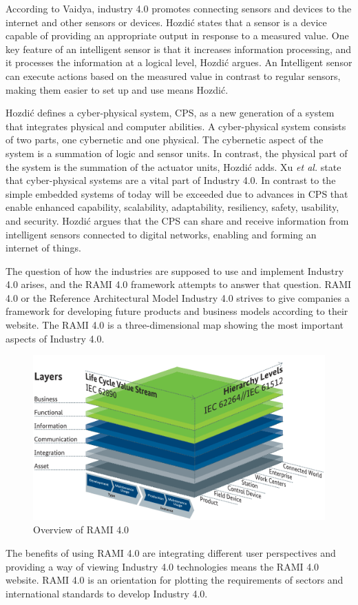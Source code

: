 According to Vaidya, industry 4.0 promotes connecting sensors and devices to the internet and other sensors or devices\cite{Vaidya2018}.
Hozdić states that a sensor is a device capable of providing an appropriate output in response to a measured value\cite{Hozdic2015}.
One key feature of an intelligent sensor is that it increases information processing, and it processes the information at a logical level, Hozdić argues.
An Intelligent sensor can execute actions based on the measured value in contrast to regular sensors, making them easier to set up and use means Hozdić. 

Hozdić defines a cyber-physical system, CPS, as a new generation of a system that integrates physical and computer abilities\cite{Hozdic2015}.
A cyber-physical system consists of two parts, one cybernetic and one physical.
The cybernetic aspect of the system is a summation of logic and sensor units. In contrast, the physical part of the system is the summation of the actuator units, Hozdić adds.
Xu \textit{et al.} state that cyber-physical systems are a vital part of Industry 4.0. In contrast to the simple embedded systems of today will be exceeded due to advances in CPS that enable enhanced capability, scalability, adaptability, resiliency, safety, usability, and security\cite{Xu2018}.
Hozdić argues that the CPS can share and receive information from intelligent sensors connected to digital networks, enabling and forming an internet of things.

The question of how the industries are supposed to use and implement Industry 4.0 arises, and the RAMI 4.0 framework attempts to answer that question.
RAMI 4.0 or the Reference Architectural Model Industry 4.0 strives to give companies a framework for developing future products and business models according to their website\cite{RAMI2021}.
The RAMI 4.0 is a three-dimensional map showing the most important aspects of Industry 4.0. 
\begin{figure}[H]
    \centering
    \includegraphics[width=\textwidth]{Pictures/RAMI.png} 
    \caption{Overview of RAMI 4.0}
    \label{RAMI4.0}
\end{figure}
The benefits of using RAMI 4.0 are integrating different user perspectives and providing a way of viewing Industry 4.0 technologies means the RAMI 4.0 website.
RAMI 4.0 is an orientation for plotting the requirements of sectors and international standards to develop Industry 4.0.
